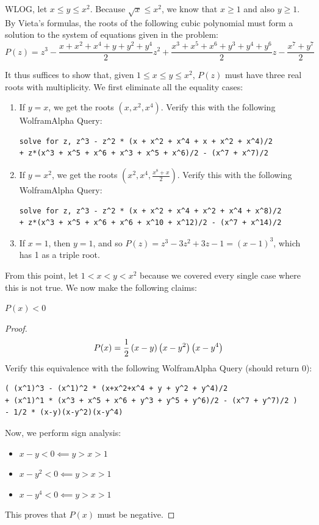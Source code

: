\documentclass[10pt]{../usamts}
\begin{document}
\begin{solution}{4}
WLOG, let $x \le y \le x^2$. Because $\sqrt{x} \le x^2$, we know that $x \ge 1$ and also $y \ge 1$. By Vieta's formulas, the roots of the following cubic polynomial must form a solution to the system of equations given in the problem:
\[
P(z) = z^3 - \frac{x + x^2 + x^4 + y + y^2 + y^4}{2}z^2 + \frac{x^3 + x^5 + x^6 + y^3 + y^4 + y^6}{2}z - \frac{x^7 + y^7}{2}
\]

It thus suffices to show that, given $1 \le x \le y \le x^2$, $P(z)$ must have three real roots with multiplicity. We first eliminate all the equality cases:

\begin{enumerate}
\item If $y=x$, we get the roots $(x, x^2, x^4)$.
    Verify this with the following WolframAlpha Query:
\begin{verbatim}
solve for z, z^3 - z^2 * (x + x^2 + x^4 + x + x^2 + x^4)/2
+ z*(x^3 + x^5 + x^6 + x^3 + x^5 + x^6)/2 - (x^7 + x^7)/2
\end{verbatim}
    
\item If $y=x^2$, we get the roots $(x^2, x^4, \frac{x^8 + x}{2})$.
    Verify this with the following WolframAlpha Query:
\begin{verbatim}
solve for z, z^3 - z^2 * (x + x^2 + x^4 + x^2 + x^4 + x^8)/2
+ z*(x^3 + x^5 + x^6 + x^6 + x^10 + x^12)/2 - (x^7 + x^14)/2
\end{verbatim}

\item If $x=1$, then $y=1$, and so $P(z) = z^3 - 3z^2 + 3z - 1 = (x-1)^3$, which has 1 as a triple root.
\end{enumerate}

From this point, let $1 < x < y < x^2$ because we covered every single case where this is not true. We now make the following claims:

\begin{claim}
    $P(x) < 0$
    \label{claim:px}
\end{claim}
\begin{proof}
    $$P(x) = \frac{1}{2}\left( x-y \right)\left( x-y^2 \right)\left( x-y^4 \right)$$
    Verify this equivalence with the following WolframAlpha Query (should return 0): 
    \begin{verbatim}
( (x^1)^3 - (x^1)^2 * (x+x^2+x^4 + y + y^2 + y^4)/2 
+ (x^1)^1 * (x^3 + x^5 + x^6 + y^3 + y^5 + y^6)/2 - (x^7 + y^7)/2 )
- 1/2 * (x-y)(x-y^2)(x-y^4)
    \end{verbatim}
    Now, we perform sign analysis:
    \begin{itemize}
        \item $x - y < 0 \impliedby y > x > 1$
        \item $x - y^2 < 0 \impliedby y > x > 1$
        \item $x - y^4 < 0 \impliedby y > x > 1$
    \end{itemize}
    This proves that $P(x)$ must be negative.
\end{proof}


\end{solution}
\end{document}
